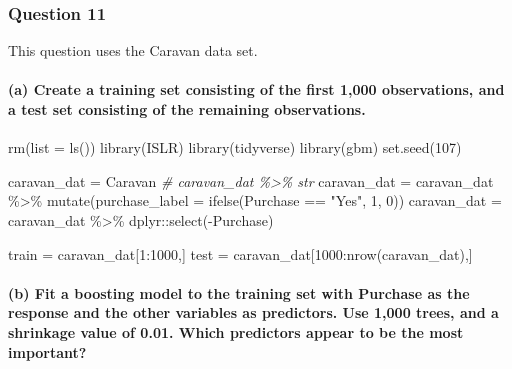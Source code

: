 \documentclass[
]{article}
\newenvironment{Shaded}{\begin{snugshade}}{\end{snugshade}}
\newcommand{\AttributeTok}[1]{\textcolor[rgb]{0.77,0.63,0.00}{#1}}
\newcommand{\CommentTok}[1]{\textcolor[rgb]{0.56,0.35,0.01}{\textit{#1}}}
\newcommand{\DecValTok}[1]{\textcolor[rgb]{0.00,0.00,0.81}{#1}}
\newcommand{\FunctionTok}[1]{\textcolor[rgb]{0.00,0.00,0.00}{#1}}
\newcommand{\NormalTok}[1]{#1}
\newcommand{\OtherTok}[1]{\textcolor[rgb]{0.56,0.35,0.01}{#1}}
\newcommand{\SpecialCharTok}[1]{\textcolor[rgb]{0.00,0.00,0.00}{#1}}
\newcommand{\StringTok}[1]{\textcolor[rgb]{0.31,0.60,0.02}{#1}}
\begin{document}
\hypertarget{question-11-1}{%
\subsubsection{Question 11}\label{question-11-1}}

This question uses the Caravan data set.

\hypertarget{a-create-a-training-set-consisting-of-the-first-1000-observations-and-a-test-set-consisting-of-the-remaining-observations.}{%
\paragraph{(a) Create a training set consisting of the first 1,000
observations, and a test set consisting of the remaining
observations.}\label{a-create-a-training-set-consisting-of-the-first-1000-observations-and-a-test-set-consisting-of-the-remaining-observations.}}

\begin{Shaded}
\begin{Highlighting}[]
\FunctionTok{rm}\NormalTok{(}\AttributeTok{list =} \FunctionTok{ls}\NormalTok{())}
\FunctionTok{library}\NormalTok{(ISLR)}
\FunctionTok{library}\NormalTok{(tidyverse)}
\FunctionTok{library}\NormalTok{(gbm)}
\FunctionTok{set.seed}\NormalTok{(}\DecValTok{107}\NormalTok{)}

\NormalTok{caravan\_dat }\OtherTok{=}\NormalTok{ Caravan}
\CommentTok{\# caravan\_dat \%\textgreater{}\% str}
\NormalTok{caravan\_dat }\OtherTok{=}\NormalTok{ caravan\_dat }\SpecialCharTok{\%\textgreater{}\%} \FunctionTok{mutate}\NormalTok{(}\AttributeTok{purchase\_label =} \FunctionTok{ifelse}\NormalTok{(Purchase }\SpecialCharTok{==} \StringTok{"Yes"}\NormalTok{, }\DecValTok{1}\NormalTok{, }\DecValTok{0}\NormalTok{))}
\NormalTok{caravan\_dat }\OtherTok{=}\NormalTok{ caravan\_dat }\SpecialCharTok{\%\textgreater{}\%}\NormalTok{ dplyr}\SpecialCharTok{::}\FunctionTok{select}\NormalTok{(}\SpecialCharTok{{-}}\NormalTok{Purchase)}

\NormalTok{train }\OtherTok{=}\NormalTok{ caravan\_dat[}\DecValTok{1}\SpecialCharTok{:}\DecValTok{1000}\NormalTok{,]}
\NormalTok{test }\OtherTok{=}\NormalTok{ caravan\_dat[}\DecValTok{1000}\SpecialCharTok{:}\FunctionTok{nrow}\NormalTok{(caravan\_dat),]}
\end{Highlighting}
\end{Shaded}

\hypertarget{b-fit-a-boosting-model-to-the-training-set-with-purchase-as-the-response-and-the-other-variables-as-predictors.-use-1000-trees-and-a-shrinkage-value-of-0.01.-which-predictors-appear-to-be-the-most-important}{%
\paragraph{(b) Fit a boosting model to the training set with Purchase as
the response and the other variables as predictors. Use 1,000 trees, and
a shrinkage value of 0.01. Which predictors appear to be the most
important?}\label{b-fit-a-boosting-model-to-the-training-set-with-purchase-as-the-response-and-the-other-variables-as-predictors.-use-1000-trees-and-a-shrinkage-value-of-0.01.-which-predictors-appear-to-be-the-most-important}}
\end{document}
